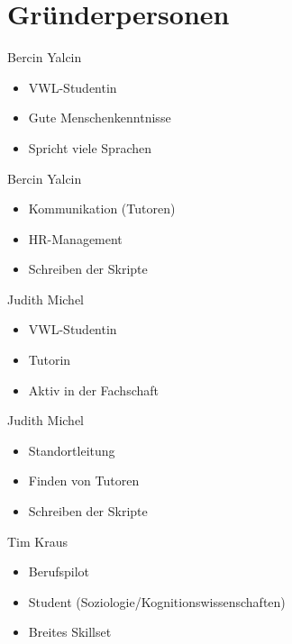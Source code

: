 \section{Gründerpersonen}


\begin{frame}[c]{Bercin Yalcin}
    \Large
    \begin{itemize}[<+(1)->]
    \item VWL-Studentin
    \item Gute Menschenkenntnisse
    \item Spricht viele Sprachen
    \end{itemize}
\end{frame}

\begin{frame}[c]{Bercin Yalcin}
    \Large
    \begin{itemize}[<+(1)->]
    \item Kommunikation (Tutoren)
    \item HR-Management
    \item Schreiben der Skripte
    \end{itemize}
\end{frame}

\begin{frame}[c]{Judith Michel}
    \Large
    \begin{itemize}[<+(1)->]
    \item VWL-Studentin
    \item Tutorin
    \item Aktiv in der Fachschaft
    \end{itemize}
\end{frame}

\begin{frame}[c]{Judith Michel}
    \Large
    \begin{itemize}[<+(1)->]
    \item Standortleitung
    \item Finden von Tutoren
    \item Schreiben der Skripte
    \end{itemize}
\end{frame}


\begin{frame}[c]{Tim Kraus}
    \Large
    \begin{itemize}[<+(1)->]
    \item Berufspilot
    \item Student (Soziologie/Kognitionswissenschaften)
    \item Breites Skillset
    \end{itemize}
\end{frame}


